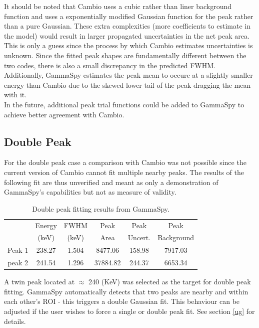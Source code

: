 \documentclass[10pt]{article}
\begin{document}
It should be noted that Cambio uses a cubic rather than liner background function and
uses a exponentially modified Gaussian function for the peak rather than a pure Gaussian.
These extra complexities (more coefficients to estimate in the model) would result in larger propagated uncertainties in the
net peak area.  This is only a guess since the process by which Cambio estimates uncertainties is unknown.
Since the fitted peak shapes are fundamentally different between the two codes, there is
also a small discrepancy in the predicted FWHM. Additionally, GammaSpy estimates the peak
mean to occure at a slightly smaller energy than Cambio due to the skewed lower tail of the peak
dragging the mean with it. \\

In the future, additional peak trial functions could be added to GammaSpy to achieve better agreement with Cambio.

\subsection{Double Peak}
For the double peak case a comparison with Cambio was not possible since the current
version of Cambio cannot fit multiple nearby peaks.  The results of the following fit
are thus unverified and meant as only a demonstration of GammaSpy's capabilities but
not as measure of validity. \\

\begin{table}[h]
\begin{center}
\begin{tabular}{|c|c|c|c|c|c|}
\hline 
   & Energy	&FWHM	&Peak	&Peak	&Peak \\
       & (keV)	&(keV)	&Area	&Uncert.	&Background\\ \hline \hline
 Peak 1&238.27 & 1.504	&  8477.06 & 158.98 & 7917.03 \\
 peak 2&241.54	& 1.296	& 37884.82  &244.37 & 6653.34 \\
\hline
\end{tabular}
\caption{Double peak fitting results from GammaSpy.}
\end{center}
\label{table_2}
\end{table}

A twin peak located at $\approx$ 240 (KeV) was selected as the target for double peak fitting.
GammaSpy automatically detects that two peaks are nearby and within each other's ROI - this triggers
a double Gaussian fit.  This behaviour can be adjusted if the user wishes to force a single or double
peak fit.  See section \ref{ug} for details.
\end{document}
